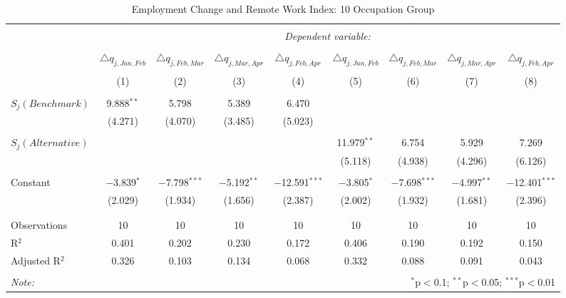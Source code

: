 
\begin{table}[!htbp] \centering 
  \caption{Employment Change and Remote Work Index: 10 Occupation Group} 
  \label{tab:regression_dynamics_10oc} 
\footnotesize 
\begin{tabular}{@{\extracolsep{5pt}}lcccccccc} 
\\[-1.8ex]\hline 
\hline \\[-1.8ex] 
 & \multicolumn{8}{c}{\textit{Dependent variable:}} \\ 
\cline{2-9} 
\\[-1.8ex] & $\triangle q_{j,Jan,Feb}$ & $\triangle q_{j,Feb,Mar}$ & $\triangle q_{j,Mar,Apr}$ & $\triangle q_{j,Feb,Apr}$ & $\triangle q_{j,Jan,Feb}$ & $\triangle q_{j,Feb,Mar}$ & $\triangle q_{j,Mar,Apr}$ & $\triangle q_{j,Feb,Apr}$ \\ 
\\[-1.8ex] & (1) & (2) & (3) & (4) & (5) & (6) & (7) & (8)\\ 
\hline \\[-1.8ex] 
 $S_{j}(Benchmark)$ & 9.888$^{**}$ & 5.798 & 5.389 & 6.470 &  &  &  &  \\ 
  & (4.271) & (4.070) & (3.485) & (5.023) &  &  &  &  \\ 
  & & & & & & & & \\ 
 $S_{j}(Alternative)$ &  &  &  &  & 11.979$^{**}$ & 6.754 & 5.929 & 7.269 \\ 
  &  &  &  &  & (5.118) & (4.938) & (4.296) & (6.126) \\ 
  & & & & & & & & \\ 
 Constant & $-$3.839$^{*}$ & $-$7.798$^{***}$ & $-$5.192$^{**}$ & $-$12.591$^{***}$ & $-$3.805$^{*}$ & $-$7.698$^{***}$ & $-$4.997$^{**}$ & $-$12.401$^{***}$ \\ 
  & (2.029) & (1.934) & (1.656) & (2.387) & (2.002) & (1.932) & (1.681) & (2.396) \\ 
  & & & & & & & & \\ 
\hline \\[-1.8ex] 
Observations & 10 & 10 & 10 & 10 & 10 & 10 & 10 & 10 \\ 
R$^{2}$ & 0.401 & 0.202 & 0.230 & 0.172 & 0.406 & 0.190 & 0.192 & 0.150 \\ 
Adjusted R$^{2}$ & 0.326 & 0.103 & 0.134 & 0.068 & 0.332 & 0.088 & 0.091 & 0.043 \\ 
\hline 
\hline \\[-1.8ex] 
\textit{Note:}  & \multicolumn{8}{r}{$^{*}$p$<$0.1; $^{**}$p$<$0.05; $^{***}$p$<$0.01} \\ 
\end{tabular} 
\end{table} 
